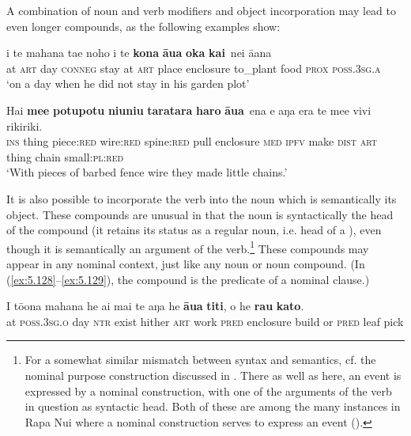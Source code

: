 A combination of noun and verb modifiers and object incorporation may lead to even longer compounds, as the following examples show:

\ea\label{ex:5.126}
\gll {\ꞌ}i te mahana ta{\ꞌ}e noho {\ꞌ}i te \textbf{kona} \textbf{{\ꞌ}āua} {\ob}\textbf{{\ꞌ}oka} \textbf{kai}\,{\cb} nei {\ꞌ}ā{\ꞌ}ana \\
at \textsc{art} day \textsc{conneg} stay at \textsc{art} place enclosure {\db}to\_plant food \textsc{prox} \textsc{poss.3sg.a} \\

\glt 
‘on a day when he did not stay in his garden plot’ \textstyleExampleref{[R381.004]} 
\z

\ea\label{ex:5.127}
\gll Hai \textbf{me{\ꞌ}e} \textbf{potupotu} \textbf{niuniu} \textbf{taratara} {\ob}\textbf{haro} \textbf{{\ꞌ}āua}\,{\cb} ena e aŋa era  te me{\ꞌ}e vivi rikiriki.\\
\textsc{ins} thing piece:\textsc{red} wire:\textsc{red} spine:\textsc{red} {\db}pull enclosure \textsc{med} \textsc{ipfv} make \textsc{dist}  \textsc{art} thing chain small:\textsc{pl}:\textsc{red}\\

\glt 
‘With pieces of barbed fence wire they made little chains.’ \textstyleExampleref{[R364.005]} 
\z

It is also possible to incorporate the verb into the noun which is semantically its object. These compounds are unusual in that the noun is syntactically the head of the compound (it retains its status as a regular noun, i.e. head of a ), even though it is semantically an argument of the verb.\footnote{\label{fn:272}For a somewhat similar mismatch between syntax and semantics, cf. the nominal purpose construction discussed in . There as well as here, an event is expressed by a nominal construction, with one of the arguments of the verb in question as syntactic head.
Both of these are among the many instances in Rapa Nui where a nominal construction serves to express an event ().} These compounds may appear in any nominal context, just like any noun or noun compound. (In (\ref{ex:5.128}–\ref{ex:5.129}), the compound is the predicate of a nominal clause.)

\ea\label{ex:5.128}
\gll {\ꞌ}I tō{\ꞌ}ona mahana he ai mai te aŋa he \textbf{{\ꞌ}āua} \textbf{titi},  {\ꞌ}o he \textbf{rau} \textbf{kato}.\\
at \textsc{poss.3sg.o} day \textsc{ntr} exist hither \textsc{art} work \textsc{pred} enclosure build  or \textsc{pred} leaf pick\\

